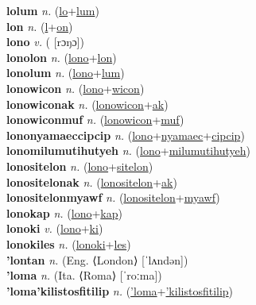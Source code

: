 \textbf{lolum} \textit{n.} (\hyperref[lo]{lo}+\hyperref[lum]{lum})
 \label{lolum} \\
\textbf{lon} \textit{n.} (\hyperref[l]{l}+\hyperref[on]{on})
 \label{lon} \\
\textbf{lono} \textit{v.} ( [rɔŋɔ])
 \label{lono} \\
\textbf{lonolon} \textit{n.} (\hyperref[lono]{lono}+\hyperref[lon]{lon})
 \label{lonolon} \\
\textbf{lonolum} \textit{n.} (\hyperref[lono]{lono}+\hyperref[lum]{lum})
 \label{lonolum} \\
\textbf{lonowicon} \textit{n.} (\hyperref[lono]{lono}+\hyperref[wicon]{wicon})
 \label{lonowicon} \\
\textbf{lonowiconak} \textit{n.} (\hyperref[lonowicon]{lonowicon}+\hyperref[ak]{ak})
 \label{lonowiconak} \\
\textbf{lonowiconmuf} \textit{n.} (\hyperref[lonowicon]{lonowicon}+\hyperref[muf]{muf})
 \label{lonowiconmuf} \\
\textbf{lononyamaeccipcip} \textit{n.} (\hyperref[lono]{lono}+\hyperref[nyamaec]{nyamaec}+\hyperref[cipcip]{cipcip})
 \label{lononyamaeccipcip} \\
\textbf{lonomilumutihutyeh} \textit{n.} (\hyperref[lono]{lono}+\hyperref[milumutihutyeh]{milumutihutyeh})
 \label{lonomilumutihutyeh} \\
\textbf{lonositelon} \textit{n.} (\hyperref[lono]{lono}+\hyperref[sitelon]{sitelon})
 \label{lonositelon} \\
\textbf{lonositelonak} \textit{n.} (\hyperref[lonositelon]{lonositelon}+\hyperref[ak]{ak})
 \label{lonositelonak} \\
\textbf{lonositelonmyawf} \textit{n.} (\hyperref[lonositelon]{lonositelon}+\hyperref[myawf]{myawf})
 \label{lonositelonmyawf} \\
\textbf{lonokap} \textit{n.} (\hyperref[lono]{lono}+\hyperref[kap]{kap})
 \label{lonokap} \\
\textbf{lonoki} \textit{v.} (\hyperref[lono]{lono}+\hyperref[ki]{ki})
 \label{lonoki} \\
\textbf{lonokiles} \textit{n.} (\hyperref[lonoki]{lonoki}+\hyperref[les]{les})
 \label{lonokiles} \\
\textbf{'lontan} \textit{n.} (Eng. ⟨London⟩ [ˈlʌndən])
 \label{'lontan} \\
\textbf{'loma} \textit{n.} (Ita. ⟨Roma⟩ [ˈroːma])
 \label{'loma} \\
\textbf{'loma'kilistosfitilip} \textit{n.} (\hyperref['loma]{'loma}+\hyperref['kilistosfitilip]{'kilistosfitilip})
